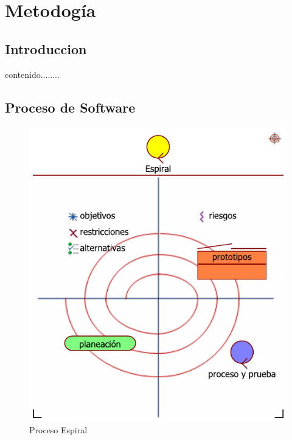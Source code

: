 \chapter{Metodogía}
\section{Introduccion}
contenido........

\newpage

\section{Proceso de Software}

\begin{figure}[h!]
	\centering
	\includegraphics[width=0.7\linewidth]{imgs/espiral}
	\caption[Espiral]{Proceso Espiral}
\end{figure}
